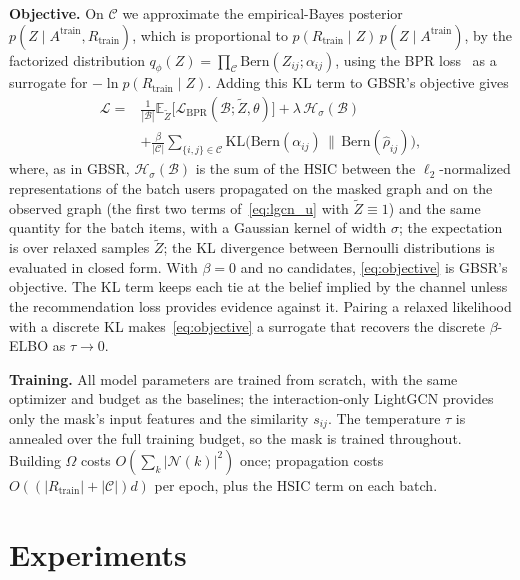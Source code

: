 \documentclass[sigconf]{acmart}
\begin{document}
\textbf{Objective.} On $\mathcal{C}$ we approximate the empirical-Bayes posterior $p(Z \mid A^{\text{train}}, R_{\text{train}})$, which is proportional to $p(R_{\text{train}} \mid Z)\, p(Z \mid A^{\text{train}})$, by the factorized distribution $q_\phi(Z) = \prod_{\mathcal{C}} \text{Bern}(Z_{ij}; \alpha_{ij})$, using the BPR loss~\cite{rendle2009bpr} as a surrogate for $-\ln p(R_{\text{train}} \mid Z)$. Adding this KL term to GBSR's objective gives
\begin{equation}
\begin{split}
    \mathcal{L} = {} & \frac{1}{|\mathcal{B}|}\mathbb{E}_{\tilde{Z}}\big[\mathcal{L}_{\text{BPR}}(\mathcal{B}; \tilde{Z}, \theta)\big] + \lambda\, \mathcal{H}_\sigma(\mathcal{B}) \\
    & + \frac{\beta}{|\mathcal{C}|} \sum_{\{i,j\} \in \mathcal{C}} \mathrm{KL}\big(\text{Bern}(\alpha_{ij}) \,\|\, \text{Bern}(\hat{\rho}_{ij})\big),
\end{split} \label{eq:objective}
\end{equation}
where, as in GBSR, $\mathcal{H}_\sigma(\mathcal{B})$ is the sum of the HSIC between the $\ell_2$-normalized representations of the batch users propagated on the masked graph and on the observed graph (the first two terms of~\eqref{eq:lgcn_u} with $\tilde{Z} \equiv 1$) and the same quantity for the batch items, with a Gaussian kernel of width $\sigma$; the expectation is over relaxed samples $\tilde{Z}$; the KL divergence between Bernoulli distributions is evaluated in closed form. With $\beta = 0$ and no candidates, \eqref{eq:objective} is GBSR's objective. The KL term keeps each tie at the belief implied by the channel unless the recommendation loss provides evidence against it. Pairing a relaxed likelihood with a discrete KL makes~\eqref{eq:objective} a surrogate that recovers the discrete $\beta$-ELBO as $\tau \to 0$.

\textbf{Training.} All model parameters are trained from scratch, with the same optimizer and budget as the baselines; the interaction-only LightGCN provides only the mask's input features and the similarity $s_{ij}$. The temperature $\tau$ is annealed over the full training budget, so the mask is trained throughout. Building $\Omega$ costs $O(\sum_k |\mathcal{N}(k)|^2)$ once; propagation costs $O((|R_{\text{train}}| + |\mathcal{C}|)d)$ per epoch, plus the HSIC term on each batch.

\section{Experiments}
\end{document}
